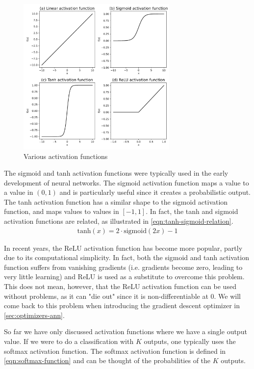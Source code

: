 \begin{figure}[H]
    \centering
    \includegraphics[width=0.7\textwidth]{thesis/figures/common-activation-functions.pdf}
    \caption{Various activation functions}
    \label{fig:activation-functions}
\end{figure}

The sigmoid and tanh activation functions were typically used in the early development of neural networks. The sigmoid activation function maps a value to a value in $(0, 1)$ and is particularly useful since it creates a probabilistic output. The tanh activation function has a similar shape to the sigmoid activation function, and maps values to values in $[-1, 1]$. In fact, the tanh and sigmoid activation functions are related, as illustrated in \cref{eqn:tanh-sigmoid-relation}.
\begin{align}
    \label{eqn:tanh-sigmoid-relation}
    \text{tanh}(x) = 2 \cdot \text{sigmoid}(2x) - 1
\end{align}

In recent years, the ReLU activation function has become more popular, partly due to its computational simplicity. In fact, both the sigmoid and tanh activation function suffers from vanishing gradients (i.e. gradients become zero, leading to very little learning) and ReLU is used as a substitute to overcome this problem. This does not mean, however, that the ReLU activation function can be used without problems, as it can "die out" since it is non-differentiable at 0. We will come back to this problem when introducing the gradient descent optimizer in \cref{sec:optimizers-ann}.

So far we have only discussed activation functions where we have a single output value. If we were to do a classification with $K$ outputs, one typically uses the softmax activation function. The softmax activation function is defined in \cref{eqn:softmax-function} and can be thought of the probabilities of the $K$ outputs.

